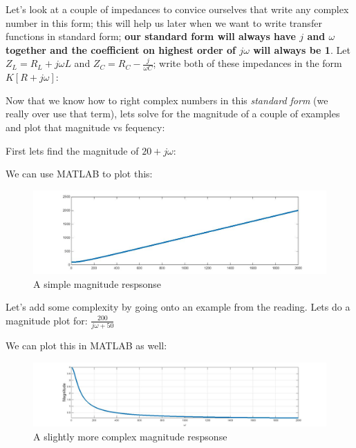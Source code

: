 \documentclass{handout}
\begin{document}
 Let's look at a couple of impedances to convice ourselves that write any complex number in this form; this will help us later when we want to write transfer functions in standard form; \textbf{our standard form will always have $j$ and $\omega$ together and the coefficient on highest order of $j\omega$ will always be 1}.  Let $Z_L = R_L+j\omega L$ and $Z_C = R_C-\frac{j}{\omega C}$; write both of these impedances in the form $K[R+j\omega]$:


Now that we know how to right complex numbers in this {\em standard form} (we really over use that term), lets solve for the magnitude of a couple of examples and plot that magnitude vs fequency:

First lets find the magnitude of $20+j\omega$:
\soln{1.5in}{
\[
|100 + j\omega|=\sqrt{100^2+\omega^2} = \sqrt{10,000 +\omega^2}
\]
}

We can use MATLAB to plot this:
\begin{figure} [h!]
\centering
\includegraphics[width=1\textwidth]{MagResponse1.jpg}
\caption{A simple magnitude respsonse}
\label{fig: MagResponse1}
\end{figure}

\newpage
\clearpage
\pagebreak

Let's add some complexity by going onto an example from the reading.  Lets do a magnitude plot for: $\frac{200}{j\omega +50}$

We can plot this in MATLAB as well:

\begin{figure} [h!]
\centering
\includegraphics[width=1\textwidth]{MagResponse2.jpg}
\caption{A slightly more complex magnitude respsonse}
\label{fig: MagResponse2}
\end{figure}
\end{document}
